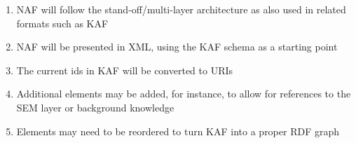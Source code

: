 \begin{enumerate}
  \item NAF will follow the stand-off/multi-layer architecture as also used in related formats such as KAF
  \item NAF will be presented in XML, using the KAF schema as a starting point
  \item The current ids in KAF will be converted to URIs
  \item Additional elements may be added, for instance, to allow for references to the SEM layer or background knowledge
  \item Elements may need to be reordered to turn KAF into a proper RDF graph
\end{enumerate}






